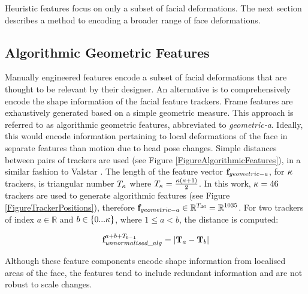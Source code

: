 Heuristic features focus on only a subset of facial deformations. The next section describes a method to encoding a broader range of face deformations.

\subsection{Algorithmic Geometric Features}
\label{SectionGenerateAlgorithmic}

Manually engineered features encode a subset of facial deformations that are thought to be relevant by their designer. An alternative is to comprehensively encode the shape information of the facial feature trackers. 
Frame features are exhaustively generated based on a simple geometric measure. This approach is referred to as algorithmic geometric features, abbreviated to \textit{geometric-a}. Ideally, this would encode information pertaining to local deformations of the face in separate features than motion due to head pose changes. Simple distances between pairs of trackers are used (see Figure \ref{FigureAlgorithmicFeatures}), in a similar fashion to Valstar \etal \cite{Valstar2006}. The length of the feature vector $\textbf{f}_{geometric-a}$, for $\kappa$ trackers, is triangular number $T_{\kappa}$ where $T_{\kappa} = \frac{\kappa(\kappa+1)}{2}$. In this work, $\kappa=46$ trackers are used to generate algorithmic features (see Figure \ref{FigureTrackerPositions}), therefore $\textbf{f}_{geometric-a} \in \mathbb{R}^{T_{46}}=\mathbb{R}^{1035}$. For two trackers of index $a \in \mathbb{R}$ and $b \in \{0...\kappa\}$, where $1 \le a < b$, the distance is computed:

\begin{gather}
\textbf{f}_{unnormalised\_alg}^{a + b + T_{b-1}} = |\textbf{T}_{a} - \textbf{T}_{b}|
\end{gather}

Although these feature components encode shape information from localised areas of the face, the features tend to include redundant information and are not robust to scale changes.

